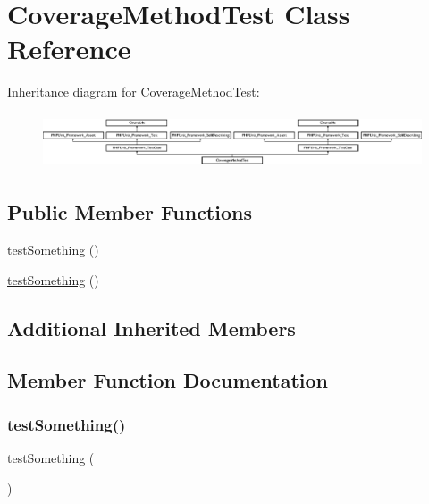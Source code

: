 \hypertarget{class_coverage_method_test}{}\section{Coverage\+Method\+Test Class Reference}
\label{class_coverage_method_test}
Inheritance diagram for Coverage\+Method\+Test\+:\begin{figure}[H]
\begin{center}
\leavevmode
\includegraphics[height=1.651917cm]{class_coverage_method_test}
\end{center}
\end{figure}
\subsection*{Public Member Functions}
\begin{DoxyCompactItemize}
\item 
\mbox{\hyperlink{class_coverage_method_test_a0fc4e17369bc9607ebdd850d9eda8167}{test\+Something}} ()
\item 
\mbox{\hyperlink{class_coverage_method_test_a0fc4e17369bc9607ebdd850d9eda8167}{test\+Something}} ()
\end{DoxyCompactItemize}
\subsection*{Additional Inherited Members}


\subsection{Member Function Documentation}
\mbox{\label{class_coverage_method_test_a0fc4e17369bc9607ebdd850d9eda8167}} 
\subsubsection{\texorpdfstring{test\+Something()}{testSomething()}\hspace{0.1cm}{\footnotesize\ttfamily [1/2]}}
{\footnotesize\ttfamily test\+Something (\begin{DoxyParamCaption}{ }\end{DoxyParamCaption})}

